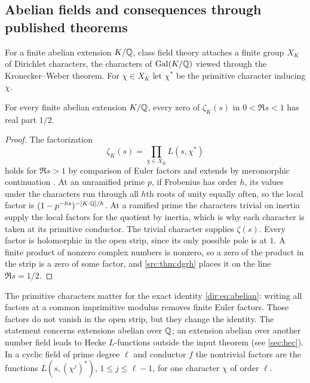 \subsection{Abelian fields and consequences through published theorems}
\label{dir:sec:published}

For a finite abelian extension $K/\mathbb{Q}$, class field theory attaches a finite group
$X_K$ of Dirichlet characters, the characters of $\operatorname{Gal}(K/\mathbb{Q})$ viewed through the
Kronecker--Weber theorem. For $\chi\in X_K$ let $\chi^*$ be the primitive character
inducing $\chi$.

\begin{proposition}\label{dir:prop:abelian}
For every finite abelian extension $K/\mathbb{Q}$, every zero of $\zeta_K(s)$ in
$0<\Re s<1$ has real part $1/2$.
\end{proposition}

\begin{proof}
The factorization
\begin{equation}\label{dir:eq:abelian}
 \zeta_K(s)=\prod_{\chi\in X_K}L(s,\chi^*)
\end{equation}
holds for $\Re s>1$ by comparison of Euler factors and extends by meromorphic
continuation \cite{Sutherland2021Kronecker}. At an unramified prime $p$, if Frobenius has
order $h$, its values under the characters run through all $h$th roots of unity equally
often, so the local factor is $(1-p^{-hs})^{-[K:\mathbb{Q}]/h}$. At a ramified prime the
characters trivial on inertia supply the local factors for the quotient by inertia,
which is why each character is taken at its primitive conductor. The trivial character
supplies $\zeta(s)$. Every factor is holomorphic in the open strip, since its only
possible pole is at $1$. A finite product of nonzero complex numbers is nonzero, so a
zero of the product in the strip is a zero of some factor, and \cref{src:thm:dgrh}
places it on the line $\Re s=1/2$.
\end{proof}

The primitive characters matter for the exact identity \eqref{dir:eq:abelian}: writing
all factors at a common imprimitive modulus removes finite Euler factors. Those factors
do not vanish in the open strip, but they change the identity. The statement concerns
extensions abelian over $\mathbb{Q}$; an extension abelian over another number field leads to
Hecke $L$-functions outside the input theorem (see \cref{sec:hec}). In a cyclic field
of prime degree $\ell$ and conductor $f$ the nontrivial factors are the functions
$L(s,(\chi^j)^*)$, $1\le j\le\ell-1$, for one character $\chi$ of order $\ell$.

